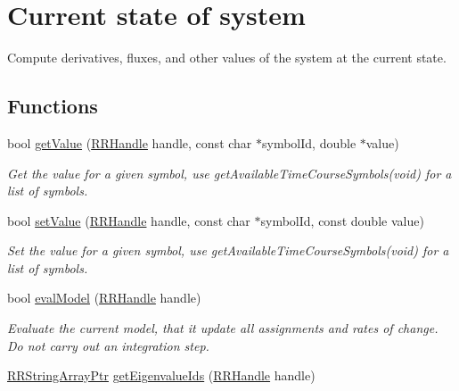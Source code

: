 \hypertarget{group__state}{\section{Current state of system}
\label{group__state}
}


Compute derivatives, fluxes, and other values of the system at the current state.  


\subsection*{Functions}
\begin{DoxyCompactItemize}
\item 
bool \hyperlink{group__state_ga7ff97de8f8ea4b16f6867ed1c24b75f6}{get\+Value} (\hyperlink{rrc__types_8h_a1d68f0592372208fa5a5f2799ea4b3ae}{R\+R\+Handle} handle, const char $\ast$symbol\+Id, double $\ast$value)
\begin{DoxyCompactList}\small\item\em Get the value for a given symbol, use get\+Available\+Time\+Course\+Symbols(void) for a list of symbols. \end{DoxyCompactList}\item 
bool \hyperlink{group__state_ga68328fbeb920109b943dfc61d9585f1e}{set\+Value} (\hyperlink{rrc__types_8h_a1d68f0592372208fa5a5f2799ea4b3ae}{R\+R\+Handle} handle, const char $\ast$symbol\+Id, const double value)
\begin{DoxyCompactList}\small\item\em Set the value for a given symbol, use get\+Available\+Time\+Course\+Symbols(void) for a list of symbols. \end{DoxyCompactList}\item 
bool \hyperlink{group__state_ga8f5b221fd8d82bc44f43f2742122f91a}{eval\+Model} (\hyperlink{rrc__types_8h_a1d68f0592372208fa5a5f2799ea4b3ae}{R\+R\+Handle} handle)
\begin{DoxyCompactList}\small\item\em Evaluate the current model, that it update all assignments and rates of change. Do not carry out an integration step. \end{DoxyCompactList}\item 
\hyperlink{rrc__types_8h_a7c9475df6c7337d99482b13a365e7596}{R\+R\+String\+Array\+Ptr} \hyperlink{group__state_gab504f19865db9d18456dd887f4f14d60}{get\+Eigenvalue\+Ids} (\hyperlink{rrc__types_8h_a1d68f0592372208fa5a5f2799ea4b3ae}{R\+R\+Handle} handle)

\end{DoxyCompactItemize}
